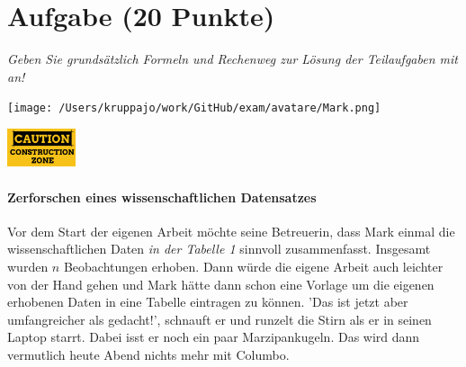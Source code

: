 \documentclass[a4paper, 9pt]{scrartcl}\usepackage[]{graphicx}\usepackage[]{xcolor}
\begin{document}
\section{Aufgabe \hfill (20 Punkte)}

\textit{Geben Sie grundsätzlich Formeln und Rechenweg zur Lösung der Teilaufgaben mit an!} \\[1Ex]
 

 
\ifcollection
\begin{flushright}
\tiny\vspace{-3Ex}
\textbf{\examinhaltstart}
\exammodulebiostat
\vspace{-4Ex}
\end{flushright}
\begin{minipage}[t]{0.5\textwidth}
\texttt{[image: /Users/kruppajo/work/GitHub/exam/avatare/Mark.png]}
\end{minipage}
\begin{minipage}[t]{0.5\textwidth}
\hfill
\href{https://youtu.be/C9skfFRTHhI}{\includegraphics[width = 2cm]{img/caution}}
\end{minipage}
\fi



\ifcollection
\paragraph{Zerforschen eines wissenschaftlichen Datensatzes}
\fi

Vor dem Start der eigenen Arbeit möchte seine Betreuerin, dass Mark einmal die wissenschaftlichen Daten \textit{in der Tabelle 1} sinnvoll zusammenfasst. Insgesamt wurden $n$ Beobachtungen erhoben. Dann würde die eigene Arbeit auch leichter von der Hand gehen und Mark hätte dann schon eine Vorlage um die eigenen erhobenen Daten in eine Tabelle eintragen zu können. 'Das ist jetzt aber umfangreicher als gedacht!', schnauft er und runzelt die Stirn als er in seinen Laptop starrt. Dabei isst er noch ein paar Marzipankugeln. Das wird dann vermutlich heute Abend nichts mehr mit Columbo.
\end{document}
